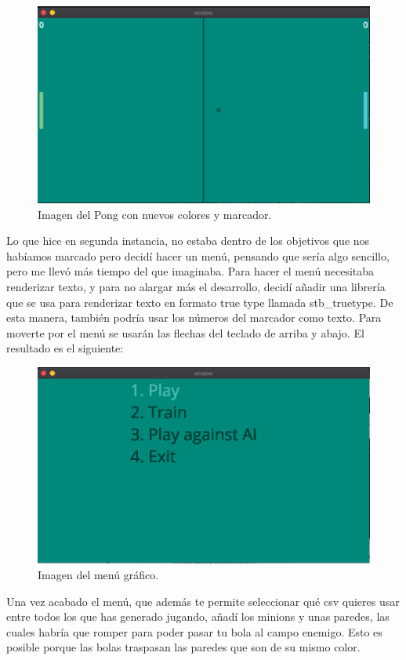 \begin{figure}[h]
	\centering
	\includegraphics[width=15cm]{archivos/imagenes/pong-nuevos-colores.png}
	\caption{Imagen del Pong con nuevos colores y marcador.}
\end{figure}

Lo que hice en segunda instancia, no estaba dentro de los objetivos que nos habíamos marcado pero decidí hacer un menú, pensando que sería algo sencillo, pero me llevó más tiempo del que imaginaba. Para hacer el menú necesitaba renderizar texto, y para no alargar más el desarrollo, decidí añadir una librería que se usa para renderizar texto en formato true type llamada stb\_truetype. De esta manera, también podría usar los números del marcador como texto. Para moverte por el menú se usarán las flechas del teclado de arriba y abajo. El resultado es el siguiente:

\begin{figure}[h]
	\centering
	\includegraphics[width=15cm]{archivos/imagenes/menu-grafico-integrado-en-el-juego.png}
	\caption{Imagen del menú gráfico.}
\end{figure}
Una vez acabado el menú, que además te permite seleccionar qué \gls{csv} quieres usar entre todos los que has generado jugando, añadí los minions y unas paredes, las cuales habría que romper para poder pasar tu bola al campo enemigo. Esto es posible porque las bolas traspasan las paredes que son de su mismo color.

